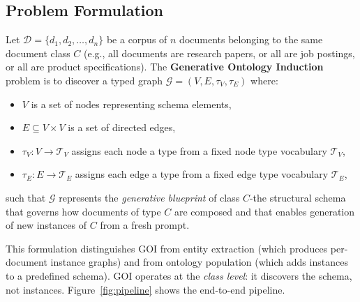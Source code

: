 \documentclass[runningheads,a4paper]{llncs}
\begin{document}
\subsection{Problem Formulation}

Let $\mathcal{D} = \{d_1, d_2, \ldots, d_n\}$ be a corpus of $n$
documents belonging to the same document class $C$ (e.g., all documents
are research papers, or all are job postings, or all are product
specifications). The \textbf{Generative Ontology Induction} problem is
to discover a typed graph $\mathcal{G} = (V, E, \tau_V, \tau_E)$ where:
\begin{itemize}
  \item $V$ is a set of nodes representing schema elements,
  \item $E \subseteq V \times V$ is a set of directed edges,
  \item $\tau_V : V \rightarrow \mathcal{T}_V$ assigns each node a type
    from a fixed node type vocabulary $\mathcal{T}_V$,
  \item $\tau_E : E \rightarrow \mathcal{T}_E$ assigns each edge a type
    from a fixed edge type vocabulary $\mathcal{T}_E$,
\end{itemize}
such that $\mathcal{G}$ represents the \emph{generative blueprint} of
class $C$-the structural schema that governs how documents of type $C$
are composed and that enables generation of new instances of $C$ from a
fresh prompt.

This formulation distinguishes GOI from entity extraction (which
produces per-document instance graphs) and from ontology population
(which adds instances to a predefined schema). GOI operates at the
\emph{class level}: it discovers the schema, not instances.
Figure~\ref{fig:pipeline} shows the end-to-end pipeline.
\end{document}
